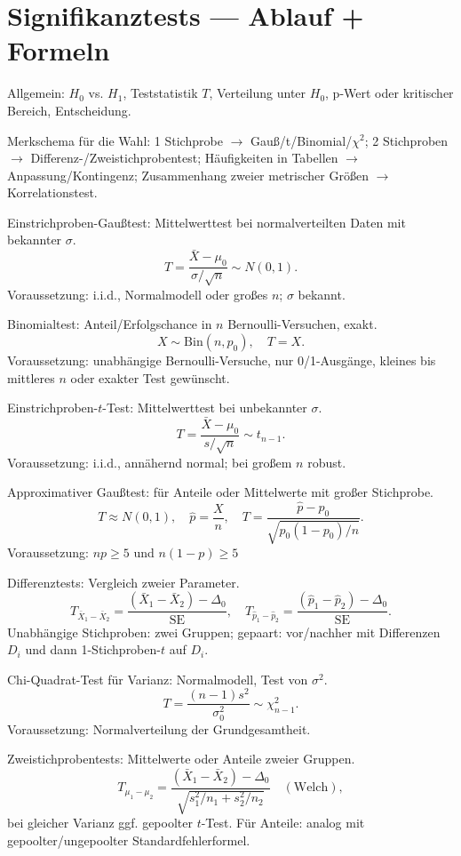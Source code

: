 \documentclass[11pt,a4paper]{article}
\begin{document}
\section*{Signifikanztests — Ablauf + Formeln}
\begin{compactenum}
\item Allgemein: $H_0$ vs. $H_1$, Teststatistik $T$, Verteilung unter $H_0$, p-Wert oder kritischer Bereich, Entscheidung.
\item Merkschema für die Wahl: 1 Stichprobe $\to$ Gauß/t/Binomial/$\chi^2$; 2 Stichproben $\to$ Differenz-/Zweistichprobentest; Häufigkeiten in Tabellen $\to$ Anpassung/Kontingenz; Zusammenhang zweier metrischer Größen $\to$ Korrelationstest.
\item Einstrichproben-Gaußtest: Mittelwerttest bei normalverteilten Daten mit bekannter $\sigma$.
\[T=\frac{\bar X-\mu_0}{\sigma/\sqrt n}\sim N(0,1).\]
Voraussetzung: i.i.d., Normalmodell oder großes $n$; $\sigma$ bekannt.
\item Binomialtest: Anteil/Erfolgschance in $n$ Bernoulli-Versuchen, exakt.
\[X\sim\mathrm{Bin}(n,p_0),\quad T=X.\]
Voraussetzung: unabhängige Bernoulli-Versuche, nur 0/1-Ausgänge, kleines bis mittleres $n$ oder exakter Test gewünscht.
\item Einstrichproben-$t$-Test: Mittelwerttest bei unbekannter $\sigma$.
\[T=\frac{\bar X-\mu_0}{s/\sqrt n}\sim t_{n-1}.\]
Voraussetzung: i.i.d., annähernd normal; bei großem $n$ robust.
\item Approximativer Gaußtest: für Anteile oder Mittelwerte mit großer Stichprobe.
\[T\approx N(0,1),\quad \hat p=\frac Xn,\quad T=\frac{\hat p-p_0}{\sqrt{p_0(1-p_0)/n}}.\]
Voraussetzung: $np\geq5$ und $n(1-p)\geq5$
\item Differenztests: Vergleich zweier Parameter.
\[T_{\bar X_1-\bar X_2}=\frac{(\bar X_1-\bar X_2)-\Delta_0}{\mathrm{SE}},\quad T_{\hat p_1-\hat p_2}=\frac{(\hat p_1-\hat p_2)-\Delta_0}{\mathrm{SE}}.\]
Unabhängige Stichproben: zwei Gruppen; gepaart: vor/nachher mit Differenzen $D_i$ und dann 1-Stichproben-$t$ auf $D_i$.
\item Chi-Quadrat-Test für Varianz: Normalmodell, Test von $\sigma^2$.
\[T=\frac{(n-1)s^2}{\sigma_0^2}\sim\chi^2_{n-1}.\]
Voraussetzung: Normalverteilung der Grundgesamtheit.
\item Zweistichprobentests: Mittelwerte oder Anteile zweier Gruppen.
\[T_{\mu_1-\mu_2}=\frac{(\bar X_1-\bar X_2)-\Delta_0}{\sqrt{s_1^2/n_1+s_2^2/n_2}}\quad(\text{Welch}),\]
bei gleicher Varianz ggf. gepoolter $t$-Test. Für Anteile: analog mit gepoolter/ungepoolter Standardfehlerformel.

\end{compactenum}
\end{document}

